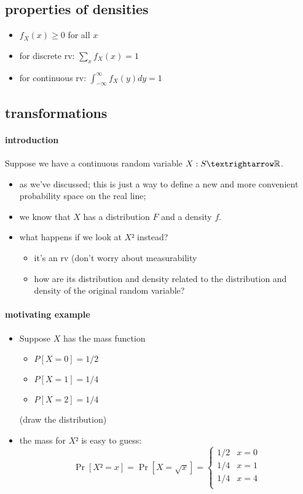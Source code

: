 \subsection{properties of densities}

\begin{itemize}
\item $f_X(x) ≥ 0$ for all $x$
\item for discrete rv: $∑_x f_X(x) = 1$
\item for continuous rv: $∫_{-∞}^{∞} f_X(y) dy = 1$
\end{itemize}

\subsection{transformations}

\paragraph{introduction}

      Suppose we have a continuous random variable $X: S → \RR$.

\begin{itemize}
\item as we've discussed; this is just a way to define a new and more
        convenient probability space on the real line;
\item we know that $X$ has a distribution $F$ and a density $f$.
\item what happens if we look at $X²$ instead?
\begin{itemize}
\item it's an rv (don't worry about measurability
\item how are its distribution and density related to the distribution
          and density of the original random variable?
\end{itemize}
\end{itemize}

\paragraph{motivating example}

\begin{itemize}
\item Suppose $X$ has the mass function
\begin{itemize}
\item $P[X = 0] = 1/2$
\item $P[X = 1] = 1/4$
\item $P[X = 2] = 1/4$
\end{itemize}
(draw the distribution)
\item the mass for $X²$ is easy to guess:
  \[\Pr[X² = x] = \Pr[X = \sqrt{x}] =
  \begin{cases}
    1/2 & x = 0 \\
    1/4 & x = 1 \\
    1/4 & x = 4 \\
  \end{cases}
  \]
\end{itemize}

